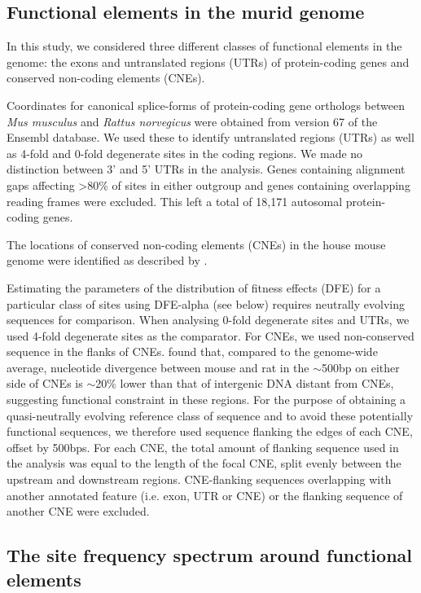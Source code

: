 \subsection{Functional elements in the murid genome}
        
	In this study, we considered three different classes of functional elements in the genome: the exons and untranslated regions (UTRs) of protein-coding genes and conserved non-coding elements (CNEs).

	Coordinates for canonical splice-forms of protein-coding gene orthologs between \textit{Mus musculus} and \textit{Rattus norvegicus} were obtained from version 67 of the Ensembl database. We used these to identify untranslated regions (UTRs) as well as 4-fold and 0-fold degenerate sites in the coding regions. We made no distinction between 3’ and 5’ UTRs in the analysis. Genes containing alignment gaps affecting >80\% of sites in either outgroup and genes containing overlapping reading frames were excluded. This left a total of 18,171 autosomal protein-coding genes.
 
	The locations of conserved non-coding elements (CNEs) in the house mouse genome were identified as described by \cite{RN122}. 

Estimating the parameters of the distribution of fitness effects (DFE) for a particular class of sites using DFE-alpha (see below) requires neutrally evolving sequences for comparison. When analysing 0-fold degenerate sites and UTRs, we used 4-fold degenerate sites as the comparator. For CNEs, we used non-conserved sequence in the flanks of CNEs. \citep{RN122} found that, compared to the genome-wide average, nucleotide divergence between mouse and rat in the $\sim$500bp on either side of CNEs is $\sim$20\% lower than that of intergenic DNA distant from CNEs, suggesting functional constraint in these regions. For the purpose of obtaining a quasi-neutrally evolving reference class of sequence and to avoid these potentially functional sequences, we therefore used sequence flanking the edges of each CNE, offset by 500bps. For each CNE, the total amount of flanking sequence used in the analysis was equal to the length of the focal CNE, split evenly between the upstream and downstream regions. CNE-flanking sequences overlapping with another annotated feature (i.e. exon, UTR or CNE) or the flanking sequence of another CNE were excluded.

\subsection{The site frequency spectrum around functional elements}
 
